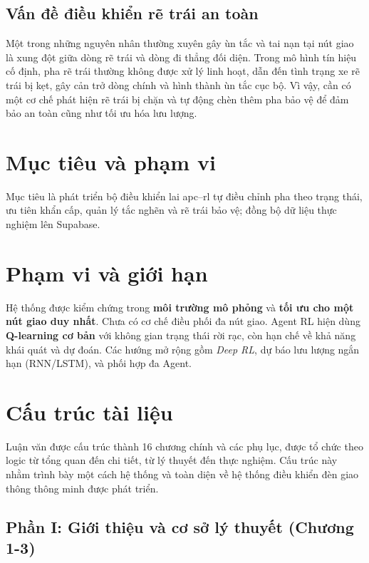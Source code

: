 \subsection{Vấn đề điều khiển rẽ trái an toàn}
 Một trong những nguyên nhân thường xuyên gây ùn tắc và tai nạn tại nút
 giao là xung đột giữa dòng rẽ trái và dòng đi thẳng đối diện. Trong mô hình
 tín hiệu cố định, pha rẽ trái thường không được xử lý linh hoạt, dẫn đến tình
 trạng xe rẽ trái bị kẹt, gây cản trở dòng chính và hình thành ùn tắc cục bộ.
 Vì vậy, cần có một cơ chế phát hiện rẽ trái bị chặn và tự động chèn thêm
 pha bảo vệ để đảm bảo an toàn cũng như tối ưu hóa lưu lượng.

\section{Mục tiêu và phạm vi}
Mục tiêu là phát triển bộ điều khiển lai \gls{apc}–\gls{rl} tự điều chỉnh pha theo trạng thái, ưu tiên khẩn cấp, quản lý tắc nghẽn và rẽ trái bảo vệ; đồng bộ dữ liệu thực nghiệm lên Supabase.

\section{Phạm vi và giới hạn}
Hệ thống được kiểm chứng trong \textbf{môi trường mô phỏng} và \textbf{tối ưu cho một nút giao duy nhất}. Chưa có cơ chế điều phối đa nút giao. Agent RL hiện dùng \textbf{Q-learning cơ bản} với không gian trạng thái rời rạc, còn hạn chế về khả năng khái quát và dự đoán. Các hướng mở rộng gồm \textit{Deep RL}, dự báo lưu lượng ngắn hạn (RNN/LSTM), và phối hợp đa Agent.

\section{Cấu trúc tài liệu}

Luận văn được cấu trúc thành 16 chương chính và các phụ lục, được tổ chức theo logic từ tổng quan đến chi tiết, từ lý thuyết đến thực nghiệm. Cấu trúc này nhằm trình bày một cách hệ thống và toàn diện về hệ thống điều khiển đèn giao thông thông minh được phát triển.

\subsection*{Phần I: Giới thiệu và cơ sở lý thuyết (Chương 1-3)}

